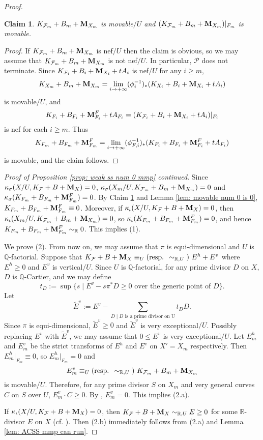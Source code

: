 \documentclass[11pt]{amsart}
\numberwithin{equation}{section}
\newcommand{\Mm}{{\bf{M}}}
\newcommand{\Qq}{\mathbb{Q}}
\newcommand{\Rr}{\mathbb{R}}
\newcommand{\Ff}{\mathcal{F}}
\newtheorem{claim}[thm]{Claim}
\theoremstyle{definition}
\theoremstyle{definition}
\theoremstyle{definition}
\begin{document}
\begin{proof}
\begin{claim}\label{claim: movable alon very general fiber}
$K_{\Ff_m}+B_m+\Mm_{X_m}$ is movable$/U$ and $(K_{\Ff_m}+B_m+\Mm_{X_m})|_{F_m}$ is movable.
\end{claim}
\begin{proof}
  If $K_{\Ff_m}+B_m+\Mm_{X_m}$ is nef$/U$ then the claim is obvious, so we may assume that $K_{\Ff_m}+B_m+\Mm_{X_m}$ is not nef$/U$. In particular, $\mathcal{P}$ does not terminate. Since $K_{\Ff_i}+B_i+\Mm_{X_i}+tA_i$ is nef$/U$ for any $i\geq m$,
  $$K_{X_m}+B_{m}+\Mm_{X_m}=\lim_{i\rightarrow+\infty}(\phi_{i}^{-1})_*(K_{X_i}+B_{i}+\Mm_{X_i}+tA_{i})$$
  is movable$/U$, and
  $$K_{F_i}+B_{F_i}+\Mm^F_{F_i}+tA_{F_i}=(K_{\Ff_i}+B_i+\Mm_{X_i}+tA_i)|_{F_i}$$
is nef for each $i\geq m$. Thus
$$K_{F_m}+B_{F_m}+\Mm^F_{F_m}=\lim_{i\rightarrow+\infty}(\phi_{F,i}^{-1})_*(K_{F_i}+B_{F_i}+\Mm^F_{F_i}+tA_{F_i})$$
is movable, and the claim follows.
\end{proof}
\noindent\textit{Proof of Proposition \ref{prop: weak ss num 0 mmp} continued}. Since $\kappa_{\sigma}(X/U,K_{\Ff}+B+\Mm_X)=0$,  $\kappa_{\sigma}(X_m/U,K_{\Ff_m}+B_m+\Mm_{X_m})=0$ and $\kappa_{\sigma}(K_{F_m}+B_{F_m}+\Mm^F_{F_m})=0$. By Claim \ref{claim: movable alon very general fiber} and Lemma \ref{lem: movable num 0 is 0}, $K_{F_m}+B_{F_m}+\Mm^F_{F_m}\equiv 0$. Moreover, if $\kappa_{\iota}(X/U,K_{\Ff}+B+\Mm_X)=0$, then $\kappa_{\iota}(X_m/U,K_{\Ff_m}+B_m+\Mm_{X_m})=0$, so $\kappa_{\iota}(K_{F_m}+B_{F_m}+\Mm^F_{F_m})=0$, and hence $K_{F_m}+B_{F_m}+\Mm^F_{F_m}\sim_{\mathbb R}0$. This implies (1).

We prove (2). From now on, we may assume that $\pi$ is equi-dimensional and $U$ is $\Qq$-factorial. Suppose that $K_{\Ff}+B+\Mm_X\equiv_U\text{(resp. }\sim_{\mathbb R,U}\text{) }E^h+E^v$ where $E^h\geq 0$ and $E^v$ is vertical$/U$. Since $U$ is $\Qq$-factorial, for any prime divisor $D$ on $X$, $D$ is $\Qq$-Cartier, and we may define
$$t_D:=\sup\{s\mid E^v-s\pi^*D\geq 0\text{ over the generic point of }D\}.$$
Let
$$\tilde E^v:=E^v-\sum_{D\mid D\text{ is a prime divisor on U}}t_DD.$$
 Since $\pi$ is equi-dimensional, $\tilde E^v\geq 0$ and $\tilde E^v$ is very exceptional$/U$. Possibly replacing $E^v$ with $\tilde E^v$, we may assume that $0\leq E^v$ is very exceptional$/U$. Let $E^h_{m}$ and $E^v_{m}$ be the strict transforms of $E^h$ and $E^v$ on $X'=X_m$ respectively. Then $E^h_{m}|_{F_m}\equiv 0$, so $E^h_{m}|_{F_m}=0$ and
$$E^v_{m}\equiv_U\text{(resp. }\sim_{\mathbb R,U}\text{) }K_{\Ff_m}+B_m+\Mm_{X_m}$$
is movable$/U$. Therefore, for any prime divisor $S$ on $X_m$ and very general curves $C$ on $S$ over $U$, $E^v_{m}\cdot C\geq 0$. By \cite[Lemma 3.3]{Bir12}, $E^v_{m}=0$. This implies (2.a).

If $\kappa_{\iota}(X/U,K_{\Ff}+B+\Mm_X)=0$, then $K_{\Ff}+B+\Mm_X\sim_{\mathbb R,U}E\geq 0$ for some $\Rr$-divisor $E$ on $X$ (cf. \cite[Definition 2.6]{HH20}). Then (2.b) immediately follows from (2.a) and Lemma \ref{lem: ACSS mmp can run}.
\end{proof}
\end{document}
